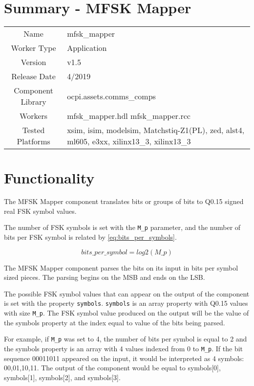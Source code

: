 \documentclass{article}
\author{} %
\date{Version \docVersion} %
\title{\docTitle}
\def\docVersion{1.5}
\def\comp{mfsk\_mapper}
\def\Comp{MFSK Mapper}
\begin{document}
\section*{Summary - \Comp}
\begin{tabular}{|c|M{13.5cm}|}
	\hline
	                  &                        	\\
	\hline
	Name              & \comp                  	\\
	\hline
	Worker Type       & Application            	\\
	\hline
	Version           & v\docVersion           	\\
	\hline
	Release Date      & 4/2019           	\\
	\hline
	Component Library & ocpi.assets.comms\_comps	\\
	\hline
	Workers           & \comp.hdl \comp.rcc       	\\
	\hline
	Tested Platforms  & xsim, isim, modelsim, Matchstiq-Z1(PL), zed, alst4, ml605, e3xx, xilinx13\_3, xilinx13\_3\\
	\hline
\end{tabular}

\section*{Functionality}
\begin{flushleft}
	The \Comp{} component translates bits or groups of bits to Q0.15 signed real FSK symbol values.\medskip

	The number of FSK symbols is set with the \verb+M_p+ parameter, and the number of bits per FSK symbol is related by \ref{eq:bits_per_symbols}.

	\begin{equation} \label{eq:bits_per_symbols}
  		bits\_per\_symbol = log2(M\_p)
	\end{equation}

	The \Comp{} component parses the bits on its input in bits per symbol sized pieces. The parsing begins on the MSB and ends on the LSB.\medskip

	The possible FSK symbol values that can appear on the output of the component is set with the property \verb+symbols+. \verb+symbols+ is an array property with Q0.15 values with size \verb+M_p+. The FSK symbol value produced on the output will be the value of the symbols property at the index equal to value of the bits being parsed.\medskip

	For example, if \verb+M_p+ was set to 4, the number of bits per symbol is equal to 2 and the symbols property is an array with 4 values indexed from 0 to \verb+M_p+. If the bit sequence 00011011 appeared on the input, it would be interpreted as 4 symbols: 00,01,10,11. The output of the component would be equal to symbols[0], symbols[1], symbols[2], and symbols[3].\medskip

\end{flushleft}
\end{document}
